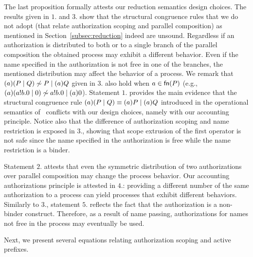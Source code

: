 The last proposition formally attests our reduction semantics design choices.
The results given in $1.$ and $3.$ show that the structural congruence rules that we do not adopt (that relate authorization scoping and parallel composition) as mentioned in Section~\ref{subsec:reduction} indeed are  unsound. %
Regardless if an authorization is distributed to both or to a single branch of the parallel composition the obtained process may exhibit a different behavior. Even if the name specified in the authorization is not free in one of the branches, the mentioned distribution may affect the behavior of a process.
We remark that $(a)(P\;|\;Q)\not\sim P\;|\;(a)Q$ given in $3.$ also hold when $a\in\mathsf{fn}(P)$ (e.g., $(a)(a!b.0\;|\;0)\not\sim a!b.0\;|\;(a)0$). Statement $1.$ provides the main evidence that the structural congruence rule $(a)(P\;|\;Q) \equiv (a)P\;|\;(a)Q$ introduced in the operational semantics of~\cite{clar:eke} conflicts with our design choices, namely with our accounting principle. 
Notice also that the difference of authorization scoping and name restriction is exposed in $3.$, showing that scope extrusion of the first operator is not safe since the name specified in the authorization is free while the name restriction is a binder.

Statement $2.$ attests that even the symmetric distribution of two authorizations over parallel 
composition may change the process behavior.
Our accounting authorizations principle is attested in $4.$: providing a different number of the same authorization to a process can yield processes that exhibit different behaviors.
Similarly to $3.$, statement $5.$ reflects the fact that the authorization is a non-binder construct. Therefore, as a result of name passing, authorizations for names not free in the process may eventually be used.


Next, we present several equations relating authorization scoping and active prefixes.

